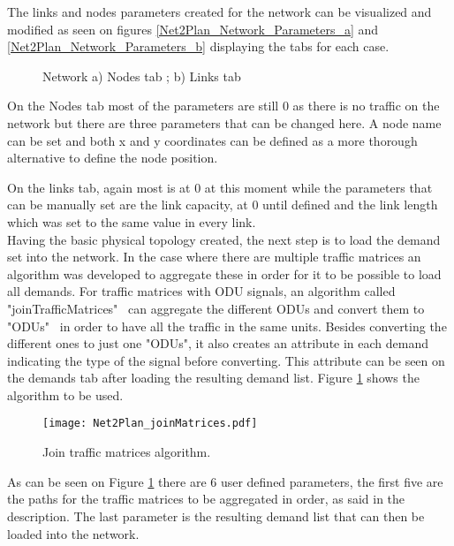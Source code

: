 	The links and nodes parameters created for the network can be visualized and modified as seen on figures \ref{Net2Plan_Network_Parameters_a} and \ref{Net2Plan_Network_Parameters_b} displaying the tabs for each case.
	

	\begin{figure}[!h]
		\centering
		\caption{Network a) Nodes tab ; b) Links tab}
	\end{figure}	
	
	On the Nodes tab most of the parameters are still 0 as there is no traffic on the network but there are three parameters that can be changed here. A node name can be set and both x and y coordinates can be defined as a more thorough alternative to define the node position.
	
	On the links tab, again most is at 0 at this moment while the parameters that can be manually set are the link capacity, at 0 until defined and the link length which was set to the same value in every link.\\
	
	Having the basic physical topology created, the next step is to load the demand set into the network. In the case where there are multiple traffic matrices an algorithm was developed to aggregate these in order for it to be possible to load all demands.
	For traffic matrices with ODU signals, an algorithm called "joinTrafficMatrices" \ can aggregate the different ODUs and convert them to "ODUs" \ in order to have all the traffic in the same units. Besides converting the different ones to just one "ODUs", it also creates an attribute in each demand indicating the type of the signal before converting. This attribute can be seen on the demands tab after loading the resulting demand list. Figure \ref{joinMatrices} shows the algorithm to be used.
	

	\begin{figure}[h!]
		\centering
		\texttt{[image: Net2Plan\_joinMatrices.pdf]}
		\caption{Join traffic matrices algorithm.}
		\label{joinMatrices}		
	\end{figure}
	
	As can be seen on Figure \ref{joinMatrices} there are 6 user defined parameters, the first five are the paths for the traffic matrices to be aggregated in order, as said in the description. The last parameter is the resulting demand list that can then be loaded into the network.
	

